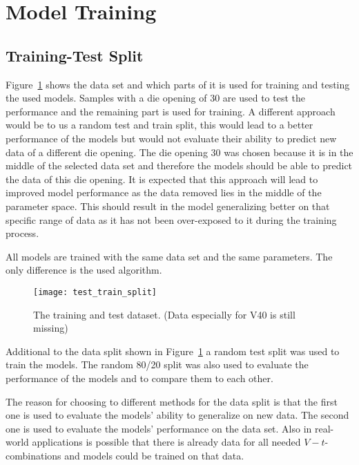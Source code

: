 \label{sec:model-training}


\section{Model Training}

\subsection{Training-Test Split}\label{subsec:training-test-split}
Figure~\ref{fig:train_test_split} shows the data set and which parts of it is used for training
and testing the used
models. Samples with a die opening of 30 are used to test the performance and the remaining part
is used for training.
A different approach would be to us a random test and train split, this would lead to a better
performance of the
models but would not evaluate their ability to predict new data of a different die opening.
The die opening 30 was chosen because it is in the middle of the selected data set and therefore
the models should be
able to predict the data of this die opening.
It is expected that this approach will lead to improved model performance as the data removed
lies in the middle of the parameter space.
This should result in the model generalizing better on that specific range of data as it has not
been over-exposed to it during the training process.

All models are trained with the same data set and the same parameters. The only difference is the
used algorithm.

\begin{figure}[H]
    \begin{tcolorbox}[arc=0pt,boxrule=0.5pt]
        \centering
        \texttt{[image: test\_train\_split]}
        \caption{The training and test dataset. (Data especially for V40 is still missing)}
        \label{fig:train_test_split}
    \end{tcolorbox}
\end{figure}

Additional to the data split shown in Figure~\ref{fig:train_test_split} a random test split was
used to train the
models. The random 80/20 split was also used to evaluate the performance of the models and to
compare them to each
other.

The reason for choosing to different methods for the data split is that the first one is used to
evaluate the models'
ability to generalize on new data. The second one is used to evaluate the models' performance on
the data set.
Also in real-world applications is possible that there is already data for all needed
$V-t$-combinations and models
could be trained on that data.

